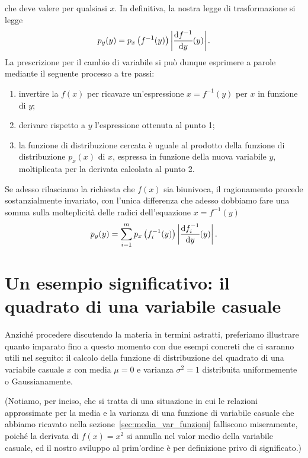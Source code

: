 che deve valere per qualsiasi $x$. In definitiva, la nostra legge di
trasformazione si legge
\begin{align}
  p_y(y) = p_x\left(f^{-1}(y)\right)\abs{\td{f^{-1}}{y}{y}}.
\end{align}
La prescrizione per il cambio di variabile si può dunque esprimere a parole
mediante il seguente processo a tre passi:
\begin{enumerate}
\item invertire la $f(x)$ per ricavare un'espressione
  $x = f^{-1}(y)$ per $x$ in funzione di $y$;
\item derivare rispetto a $y$ l'espressione ottenuta al punto 1;
\item la funzione di distribuzione cercata è uguale al prodotto della
  funzione di distribuzione $p_x(x)$ di $x$, espressa in funzione della nuova
  variabile $y$, moltiplicata per la derivata calcolata al punto 2.
\end{enumerate}

Se adesso rilasciamo la richiesta che $f(x)$ sia biunivoca, il ragionamento
procede sostanzialmente invariato, con l'unica differenza che adesso
dobbiamo fare una somma sulla molteplicità delle radici dell'equazione
$x = f^{-1}(y)$
\begin{align}
  p_y(y) = \sum_{i = 1}^m p_x\left(f^{-1}_i(y)\right)\abs{\td{f^{-1}_i}{y}{y}}.
\end{align}


\section{Un esempio significativo: il quadrato di una variabile casuale}
\label{sec:pdf_quadrato}

Anziché procedere discutendo la materia in termini astratti, preferiamo
illustrare quanto imparato fino a questo momento con due esempi concreti che ci
saranno utili nel seguito: il calcolo della funzione di distribuzione
del quadrato di una variabile casuale $x$ con media $\mu = 0$ e varianza
$\sigma^2 = 1$ distribuita uniformemente o Gaussianamente.

(Notiamo, per inciso, che si tratta di una situazione in cui le relazioni
approssimate per la media e la varianza di una funzione di variabile casuale
che abbiamo ricavato nella sezione~\ref{sec:media_var_funzioni} falliscono
miseramente, poiché la derivata di $f(x) = x^2$ si annulla nel valor medio
della variabile casuale, ed il nostro sviluppo al prim'ordine è per
definizione privo di significato.)


